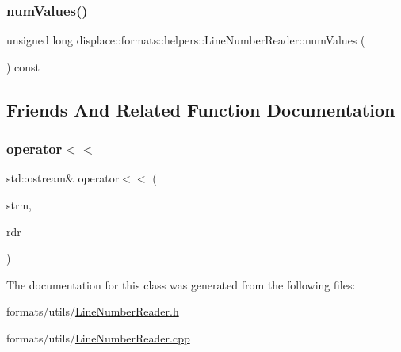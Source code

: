 \subsubsection{\texorpdfstring{numValues()}{numValues()}}
{\footnotesize\ttfamily unsigned long displace\+::formats\+::helpers\+::\+Line\+Number\+Reader\+::num\+Values (\begin{DoxyParamCaption}{ }\end{DoxyParamCaption}) const\hspace{0.3cm}{\ttfamily [inline]}}



\subsection{Friends And Related Function Documentation}
\mbox{\label{classdisplace_1_1formats_1_1helpers_1_1_line_number_reader_aaf1f7910c711e89433025972c4dae158}} 
\subsubsection{\texorpdfstring{operator$<$$<$}{operator<<}}
{\footnotesize\ttfamily std\+::ostream\& operator$<$$<$ (\begin{DoxyParamCaption}\item[{std\+::ostream \&}]{strm,  }\item[{const \mbox{\hyperlink{classdisplace_1_1formats_1_1helpers_1_1_line_number_reader}{Line\+Number\+Reader}} \&}]{rdr }\end{DoxyParamCaption})\hspace{0.3cm}{\ttfamily [friend]}}



The documentation for this class was generated from the following files\+:\begin{DoxyCompactItemize}
\item 
formats/utils/\mbox{\hyperlink{_line_number_reader_8h}{Line\+Number\+Reader.\+h}}\item 
formats/utils/\mbox{\hyperlink{_line_number_reader_8cpp}{Line\+Number\+Reader.\+cpp}}\end{DoxyCompactItemize}
